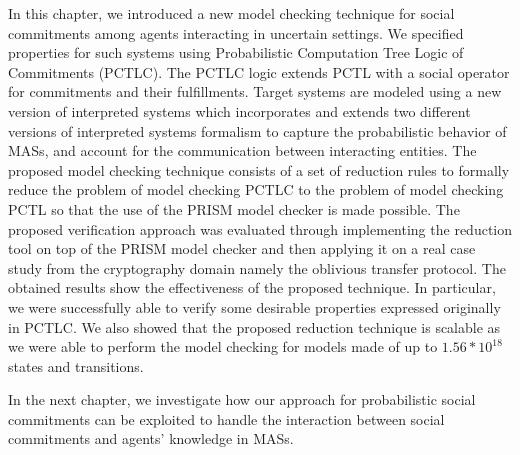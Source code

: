 In this chapter, we introduced a new model checking technique for
social commitments among agents interacting in uncertain settings.
We specified properties for such systems using Probabilistic
Computation Tree Logic of Commitments (PCTLC). The PCTLC logic
extends PCTL with a social operator for commitments and their
fulfillments. Target systems are modeled using a new version of
interpreted systems which incorporates and extends two different
versions of interpreted systems formalism to capture the
probabilistic behavior of MASs, and account for the communication
between interacting entities. The proposed model checking
technique consists of a set of reduction rules to formally reduce
the problem of model checking PCTLC to the problem of model
checking PCTL so that the use of the PRISM model checker is made
possible. The proposed verification approach was evaluated through
implementing the reduction tool on top of the PRISM model checker
and then applying it on a real case study from the cryptography
domain namely the oblivious transfer protocol. The obtained
results show the effectiveness of the proposed technique. In
particular, we were successfully able to verify some desirable
properties expressed originally in PCTLC. We also showed that the
proposed reduction technique is scalable as we were able to perform the model checking for models made of up to $1.56*10^{18}$ states
and transitions.

In the next chapter, we investigate how our approach for probabilistic social commitments can be exploited to handle the interaction between social commitments and agents' knowledge in MASs.


